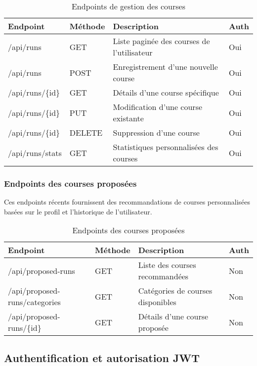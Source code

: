 \begin{table}[h]
\centering
\small
\begin{tabularx}{\textwidth}{|l|l|X|l|}
\hline
\textbf{Endpoint} & \textbf{Méthode} & \textbf{Description} & \textbf{Auth} \\
\hline
/api/runs & GET & Liste paginée des courses de l'utilisateur & Oui \\
\hline
/api/runs & POST & Enregistrement d'une nouvelle course & Oui \\
\hline
/api/runs/\{id\} & GET & Détails d'une course spécifique & Oui \\
\hline
/api/runs/\{id\} & PUT & Modification d'une course existante & Oui \\
\hline
/api/runs/\{id\} & DELETE & Suppression d'une course & Oui \\
\hline
/api/runs/stats & GET & Statistiques personnalisées des courses & Oui \\
\hline
\end{tabularx}
\caption{Endpoints de gestion des courses}
\end{table}

\subsubsection{Endpoints des courses proposées}

Ces endpoints récents fournissent des recommandations de courses personnalisées basées sur le profil et l'historique de l'utilisateur.

\begin{table}[h]
\centering
\small
\begin{tabularx}{\textwidth}{|l|l|X|l|}
\hline
\textbf{Endpoint} & \textbf{Méthode} & \textbf{Description} & \textbf{Auth} \\
\hline
/api/proposed-runs & GET & Liste des courses recommandées & Non \\
\hline
/api/proposed-runs/categories & GET & Catégories de courses disponibles & Non \\
\hline
/api/proposed-runs/\{id\} & GET & Détails d'une course proposée & Non \\
\hline
\end{tabularx}
\caption{Endpoints des courses proposées}
\end{table}

\subsection{Authentification et autorisation JWT}

